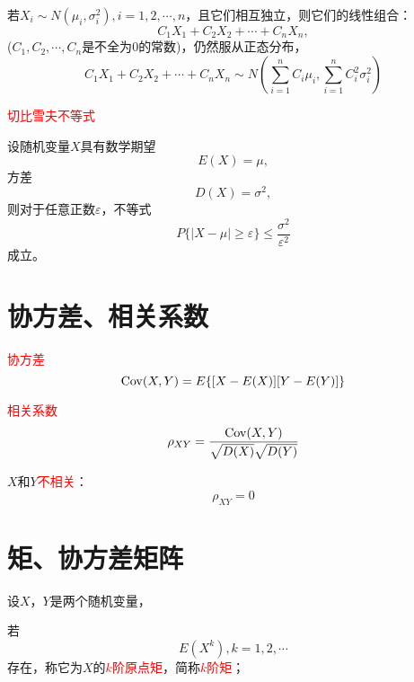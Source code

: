 \documentclass[12pt,a4paper]{article}
\begin{document}
若$X_i \sim N(\mu_i, \sigma^2_i), i = 1,2,\cdots, n$，且它们相互独立，则它们的线性组合：
\begin{equation}
C_1 X_1 +C_2 X_2 +\cdots +C_n X_n,
\end{equation}
($C_1, C_2, \cdots, C_n$是不全为$0$的常数)，仍然服从正态分布，
\begin{equation}
C_1 X_1 +C_2 X_2 +\cdots +C_n X_n \sim N\left(\sum_{i=1}^{n}C_i \mu_i, \sum_{i=1}^{n} C^2_i \sigma^2_i \right )
\end{equation}

\textcolor{red}{切比雪夫不等式}

设随机变量$X$具有数学期望
\begin{equation}
E(X) = \mu,
\end{equation}
方差
\begin{equation}
D(X) = \sigma^2,
\end{equation}
则对于任意正数$\varepsilon$，不等式
\begin{equation}
P\{|X-\mu| \geq \varepsilon\} \leq \frac{\sigma^2}{\varepsilon^2}
\end{equation}
成立。


\section{协方差、相关系数}

\textcolor{red}{协方差}
\begin{equation}
{\rm Cov}(X, Y) = E\{[X-E(X)][Y-E(Y)]\}
\end{equation}

\textcolor{red}{相关系数}
\begin{equation}
\rho_{XY} = \frac{{\rm Cov}(X, Y)}{\sqrt{D(X)}\sqrt{D(Y)}}
\end{equation}

$X$和$Y$\textcolor{red}{不相关}：
\begin{equation}
\rho_{XY} = 0
\end{equation}



\section{矩、协方差矩阵}
设$X$，$Y$是两个随机变量，

若
\begin{equation}
E(X^k), k = 1,2,\cdots
\end{equation}
存在，称它为$X$的\textcolor{red}{$k$阶原点矩}，简称\textcolor{red}{$k$阶矩}；
\end{document}
